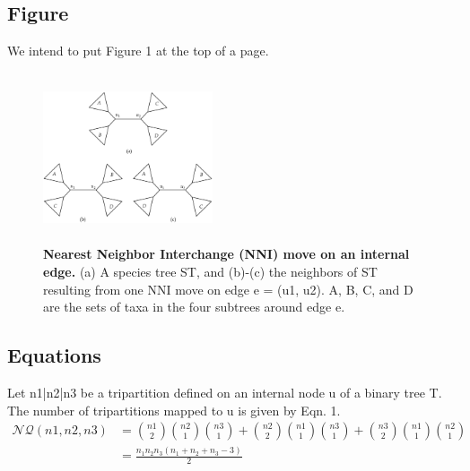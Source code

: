 \documentclass[11pt]{article}
\begin{document}
\subsection{Figure}
We intend to put Figure 1 at the top of a page.
\begin{figure}[t]
	\centering
	\includegraphics[width=5cm,height=5cm,scale=0.4]{17-CSE300_online-Figure3.pdf}
	\caption{\textbf{Nearest Neighbor Interchange (NNI) move on an internal edge.} (a) A species tree ST, and (b)-(c) the neighbors of ST resulting from one NNI move on edge e = (u1, u2). A, B, C, and D are the sets of taxa in the four subtrees around edge e.}
\end{figure}
\subsection{Equations}
Let n1|n2|n3 be a tripartition defined on an internal node u of a binary tree T. The number of tripartitions mapped to u is given by Eqn. 1.
\begin{equation}
\begin{aligned}
    \mathcal{N Q} (n1,n2,n3) &= 
   \binom{n1}{2} \binom{n2}{1} \binom{n3}{1} + \binom{n2}{2} \binom{n1}{1} \binom{n3}{1} + \binom{n3}{2} \binom{n1}{1} \binom{n2}{1}\\
   &=\frac{n_1n_2n_3(n_1 + n_2  +n_3 - 3)}{2}
\end{aligned}
\end{equation}
\end{document}
